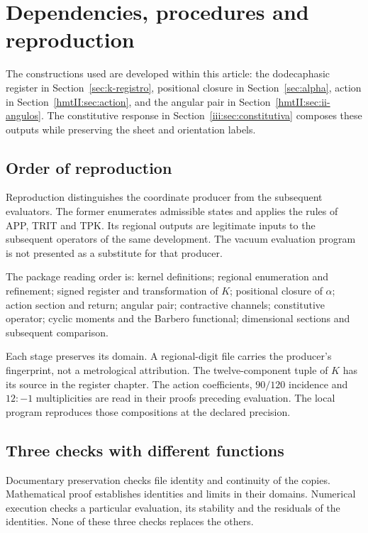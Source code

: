 \section{Dependencies, procedures and reproduction}

The constructions used are developed within this article:
the dodecaphasic register in Section~\ref{sec:k-registro}, positional
closure in Section~\ref{sec:alpha}, action in
Section~\ref{hmtII:sec:action}, and the angular pair in
Section~\ref{hmtII:sec:ii-angulos}. The constitutive response in
Section~\ref{iii:sec:constitutiva} composes these outputs while
preserving the sheet and orientation labels.

\subsection{Order of reproduction}

Reproduction distinguishes the coordinate producer from the subsequent
evaluators. The former enumerates admissible states and applies the rules
of APP, TRIT and TPK. Its regional outputs are legitimate inputs to the
subsequent operators of the same development. The vacuum evaluation
program is not presented as a substitute for that producer.

The package reading order is: kernel definitions; regional enumeration
and refinement; signed register and transformation of $K$;
positional closure of $\alpha$; action section and return; angular pair;
contractive channels; constitutive operator; cyclic moments and the
Barbero functional; dimensional sections and subsequent comparison.

Each stage preserves its domain. A regional-digit file carries the
producer's fingerprint, not a metrological attribution. The twelve-component
tuple of $K$ has its source in the register chapter. The
action coefficients, $90/120$ incidence and $12:-1$
multiplicities are read in their proofs preceding evaluation. The
local program reproduces those compositions at the declared precision.

\subsection{Three checks with different functions}

Documentary preservation checks file identity and continuity
of the copies. Mathematical proof establishes identities and limits
in their domains. Numerical execution checks a particular evaluation,
its stability and the residuals of the identities. None of these three
checks replaces the others.

